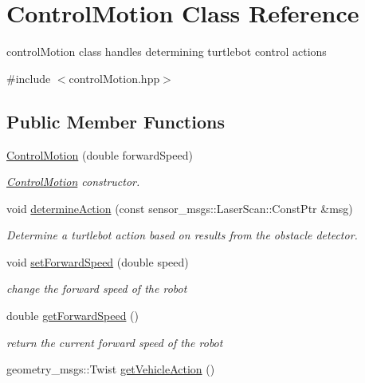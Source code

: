 \hypertarget{class_control_motion}{}\section{Control\+Motion Class Reference}
\label{class_control_motion}


control\+Motion class handles determining turtlebot control actions  




{\ttfamily \#include $<$control\+Motion.\+hpp$>$}

\subsection*{Public Member Functions}
\begin{DoxyCompactItemize}
\item 
\hyperlink{class_control_motion_a7f8e9917794cddce17cd6626d4f6de99}{Control\+Motion} (double forward\+Speed)
\begin{DoxyCompactList}\small\item\em \hyperlink{class_control_motion}{Control\+Motion} constructor. \end{DoxyCompactList}\item 
void \hyperlink{class_control_motion_a931381d78d7ae540390783cf2d6f17f3}{determine\+Action} (const sensor\+\_\+msgs\+::\+Laser\+Scan\+::\+Const\+Ptr \&msg)
\begin{DoxyCompactList}\small\item\em Determine a turtlebot action based on results from the obstacle detector. \end{DoxyCompactList}\item 
void \hyperlink{class_control_motion_a4848f58ac1fe99f22d09de221e41e467}{set\+Forward\+Speed} (double speed)
\begin{DoxyCompactList}\small\item\em change the forward speed of the robot \end{DoxyCompactList}\item 
double \hyperlink{class_control_motion_a0fd730a5681ddd611996931656336fee}{get\+Forward\+Speed} ()
\begin{DoxyCompactList}\small\item\em return the current forward speed of the robot \end{DoxyCompactList}\item 
geometry\+\_\+msgs\+::\+Twist \hyperlink{class_control_motion_a24774c339cc8e596c549b000559c68f6}{get\+Vehicle\+Action} ()

\end{DoxyCompactItemize}
